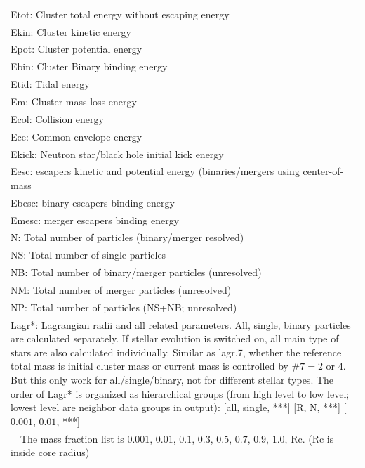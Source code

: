 \begin{longtable}{||p{0.42in}|p{0.25in}|p{0.6in}|p{0.6in}|p{0.4in}|p{2.3in}||}
\multicolumn{6}{|p{5.4in}|}{Etot: Cluster total energy without escaping energy}\\
\multicolumn{6}{|p{5.4in}|}{Ekin: Cluster kinetic energy}\\
\multicolumn{6}{|p{5.4in}|}{Epot: Cluster potential energy}\\
\multicolumn{6}{|p{5.4in}|}{Ebin: Cluster Binary binding energy}\\
\multicolumn{6}{|p{5.4in}|}{Etid: Tidal energy}\\
\multicolumn{6}{|p{5.4in}|}{Em: Cluster mass loss energy}\\
\multicolumn{6}{|p{5.4in}|}{Ecol: Collision energy}\\
\multicolumn{6}{|p{5.4in}|}{Ece: Common envelope energy}\\
\multicolumn{6}{|p{5.4in}|}{Ekick: Neutron star/black hole initial kick energy}\\
\multicolumn{6}{|p{5.4in}|}{Eesc: escapers kinetic and potential energy (binaries/mergers using center-of-mass}\\
\multicolumn{6}{|p{5.4in}|}{Ebesc: binary escapers binding energy}\\
\multicolumn{6}{|p{5.4in}|}{Emesc: merger escapers binding energy}\\
\multicolumn{6}{|p{5.4in}|}{N: Total number of particles (binary/merger resolved)}\\
\multicolumn{6}{|p{5.4in}|}{NS: Total number of single particles}\\
\multicolumn{6}{|p{5.4in}|}{NB: Total number of binary/merger particles (unresolved)}\\
\multicolumn{6}{|p{5.4in}|}{NM: Total number of merger particles (unresolved)}\\
\multicolumn{6}{|p{5.4in}|}{NP: Total number of particles (NS+NB; unresolved)}\\
\multicolumn{6}{|p{5.4in}|}{Lagr*: Lagrangian radii and all related parameters. All, single, binary particles are calculated separately. If stellar evolution is switched on, all main type of stars are also calculated individually. Similar as lagr.7, whether the reference total mass is initial cluster mass or current mass is controlled by $\#7=2$ or $4$. But this only work for all/single/binary, not for different stellar types. The order of Lagr* is organized as hierarchical groups (from high level to low level; lowest level are neighbor data groups in output): [all, single, ***] [R, N, ***] [$0.001$, $0.01$, ***] }\\
\multicolumn{6}{|p{5.4in}|}{~~The mass fraction list is $0.001$, $0.01$, $0.1$, $0.3$, $0.5$, $0.7$, $0.9$, $1.0$, Rc. (Rc is inside core radius)}\\

\end{longtable}
